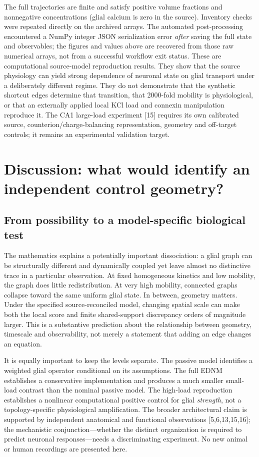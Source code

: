 \documentclass[
  11pt,
]{article}
\begin{document}
The full trajectories are finite and satisfy positive volume fractions
and nonnegative concentrations (glial calcium is zero in the source).
Inventory checks were repeated directly on the archived arrays. The
automated post-processing encountered a NumPy integer JSON serialization
error \emph{after} saving the full state and observables; the figures
and values above are recovered from those raw numerical arrays, not from
a successful workflow exit status. These are computational source-model
reproduction results. They show that the source physiology can yield
strong dependence of neuronal state on glial transport under a
deliberately different regime. They do not demonstrate that the
synthetic shortcut edges determine that transition, that 2000-fold
mobility is physiological, or that an externally applied local KCl load
and connexin manipulation reproduce it. The CA1 large-load experiment
{[}15{]} requires its own calibrated source, counterion/charge-balancing
representation, geometry and off-target controls; it remains an
experimental validation target.

\section{Discussion: what would identify an independent control
geometry?}\label{discussion-what-would-identify-an-independent-control-geometry}

\subsection{From possibility to a model-specific biological
test}\label{from-possibility-to-a-model-specific-biological-test}

The mathematics explains a potentially important dissociation: a glial
graph can be structurally different and dynamically coupled yet leave
almost no distinctive trace in a particular observation. At fixed
homogeneous kinetics and low mobility, the graph does little
redistribution. At very high mobility, connected graphs collapse toward
the same uniform glial state. In between, geometry matters. Under the
specified source-reconciled model, changing spatial scale can make both
the local score and finite shared-support discrepancy orders of
magnitude larger. This is a substantive prediction about the
relationship between geometry, timescale and observability, not merely a
statement that adding an edge changes an equation.

It is equally important to keep the levels separate. The passive model
identifies a weighted glial operator conditional on its assumptions. The
full EDNM establishes a conservative implementation and produces a much
smaller small-load contrast than the nominal passive model. The
high-load reproduction establishes a nonlinear computational positive
control for glial \emph{strength}, not a topology-specific physiological
amplification. The broader architectural claim is supported by
independent anatomical and functional observations {[}5,6,13,15,16{]};
the mechanistic conjunction---whether the distinct organization is
required to predict neuronal responses---needs a discriminating
experiment. No new animal or human recordings are presented here.
\end{document}
